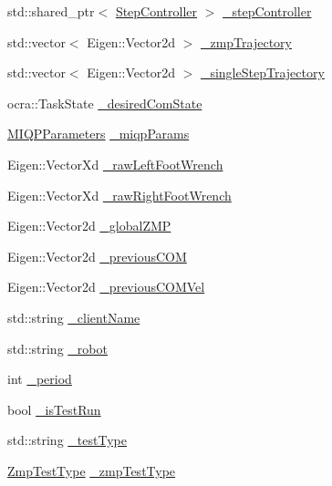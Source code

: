 \begin{DoxyCompactItemize}
\item 
std\-::shared\-\_\-ptr$<$ \hyperlink{classStepController}{\-Step\-Controller} $>$ \hyperlink{classWalkingClient_aff3d76fc360548d6c0c0ea540a0b7509}{\-\_\-step\-Controller}
\item 
std\-::vector$<$ \-Eigen\-::\-Vector2d $>$ \hyperlink{classWalkingClient_a8b8a3d7fe6e12d49a0e72d05f9938564}{\-\_\-zmp\-Trajectory}
\item 
std\-::vector$<$ \-Eigen\-::\-Vector2d $>$ \hyperlink{classWalkingClient_a5d74b737b225cec818922a2b774eed9e}{\-\_\-single\-Step\-Trajectory}
\item 
ocra\-::\-Task\-State \hyperlink{classWalkingClient_a2625bf687aa3141f5a2404c8d9b3c392}{\-\_\-desired\-Com\-State}
\item 
\hyperlink{structMIQPParameters}{\-M\-I\-Q\-P\-Parameters} \hyperlink{classWalkingClient_a5035091f977f37b7d2df284015242d6c}{\-\_\-miqp\-Params}
\item 
\-Eigen\-::\-Vector\-Xd \hyperlink{classWalkingClient_a1c3fb4d182e33d6d9386e9bb05aa4ae8}{\-\_\-raw\-Left\-Foot\-Wrench}
\item 
\-Eigen\-::\-Vector\-Xd \hyperlink{classWalkingClient_a9df32e0c73632c5f869e5933e20def71}{\-\_\-raw\-Right\-Foot\-Wrench}
\item 
\-Eigen\-::\-Vector2d \hyperlink{classWalkingClient_aa784eac1247f0d858e2364e0c2bc25b2}{\-\_\-global\-Z\-M\-P}
\item 
\-Eigen\-::\-Vector2d \hyperlink{classWalkingClient_a549751e511e023d5fc73eccd1c185317}{\-\_\-previous\-C\-O\-M}
\item 
\-Eigen\-::\-Vector2d \hyperlink{classWalkingClient_aa0c7669193a8a42ed289c79523580033}{\-\_\-previous\-C\-O\-M\-Vel}
\item 
std\-::string \hyperlink{classWalkingClient_aff02b341d5e1f500dc9a849337319a8d}{\-\_\-client\-Name}
\item 
std\-::string \hyperlink{classWalkingClient_a67461634d7e8cb0234400b34fd2865e7}{\-\_\-robot}
\item 
int \hyperlink{classWalkingClient_a6dc3e018cfeeea3407a3326fb2445d17}{\-\_\-period}
\item 
bool \hyperlink{classWalkingClient_a4f9c8688537ddd8a487a212fbb279a9b}{\-\_\-is\-Test\-Run}
\item 
std\-::string \hyperlink{classWalkingClient_a35c00feb4e7dfa532e43241e855fec89}{\-\_\-test\-Type}
\item 
\hyperlink{utils_8h_afc01479a47f5a87462a54b6a9e11fffa}{\-Zmp\-Test\-Type} \hyperlink{classWalkingClient_a14576258d7fed1b36919145f1b56d74c}{\-\_\-zmp\-Test\-Type}

\end{DoxyCompactItemize}
